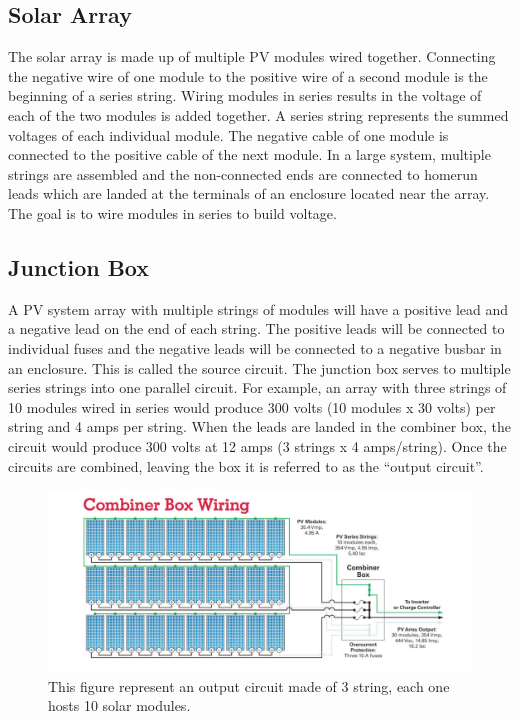\subsection{Solar Array}
The solar array is made up of multiple PV modules wired
together. Connecting the negative wire of one module to
the positive wire of a second module is the beginning of a
series string. Wiring modules in series results in the voltage of
each of the two modules is added together. A series string represents the summed voltages of each
individual module. The negative cable of one module is connected
to the positive cable of the next module. In a large system,
multiple strings are assembled and the non-connected ends are
connected to homerun leads which are landed at the terminals
of an enclosure located near the array.
The goal is to wire modules in series to build voltage.

\subsection{Junction Box}
A PV system array with multiple strings of modules will
have a positive lead and a negative lead on the end of each
string. The positive leads will be connected to individual
fuses and the negative leads will be connected to a negative
busbar in an enclosure. This is called the source circuit. The
junction box serves to  multiple series strings into
one parallel circuit. For example, an array with three strings
of 10 modules wired in series would produce 300 volts (10
modules x 30 volts) per string and 4 amps per string. When
the leads are landed in the combiner box, the circuit would
produce 300 volts at 12 amps (3 strings x 4 amps/string). Once
the circuits are combined, leaving the box it is referred to as
the “output circuit”.

\begin{figure}[H]
    \centering
    \includegraphics[width=\textwidth, keepaspectratio]{chapters/1_introduction/imgs/junctionbox.png}
    \caption{This figure represent an output circuit made of 3 string, each one hosts 10 solar modules.}
    \label{fig:outcircuit}
\end{figure}

